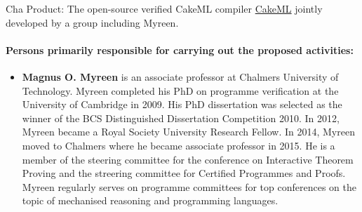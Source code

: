 \begin{sitedescription}{Cha}
Product: The open-source verified CakeML compiler \href{https://cakeml.org/}{CakeML}
jointly developed by a group including Myreen.

\paragraph*{Persons primarily responsible for carrying out the proposed activities:}

\begin{itemize}
\item \textbf{Magnus O. Myreen} is an associate professor at Chalmers
  University of Technology.  Myreen completed his PhD on programme
  verification at the University of Cambridge in 2009. His PhD
  dissertation was selected as the winner of the BCS Distinguished
  Dissertation Competition 2010. In 2012, Myreen became a Royal
  Society University Research Fellow. In 2014, Myreen moved to
  Chalmers where he became associate professor in 2015.  He is a
  member of the steering committee for the conference on Interactive
  Theorem Proving and the streering committee for Certified Programmes
  and Proofs.  Myreen regularly serves on programme committees for top
  conferences on the topic of mechanised reasoning and programming
  languages.
\end{itemize}

\end{sitedescription}

